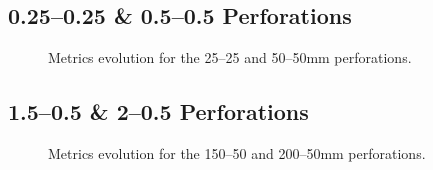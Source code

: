 \FloatBarrier
\pagebreak
\subsection{0.25--0.25 \& 0.5--0.5 Perforations}
\begin{figure}[!h]
    \centering
    
    \vspace*{-2em}
    \caption{Metrics evolution for the 25--25 and 50--50\si{\mm} perforations.}
    \label{fig:25--25-50--50-metrics-full}
\end{figure}

\begin{table}[!h]
    \caption{Numerical values of the metrics for the 25--25 and 50--50\si{\mm} perforations.}
    \label{tab:25--25-50--50}
    \begin{subtable}[t]{\linewidth}
        \centering
        \caption{0.25--0.25\si{\mm} Baseline controller}
        \label{tab:25--25-baseline}
        
    \end{subtable}
    \begin{subtable}[t]{\linewidth}
        \centering
        \vspace*{1em}
        \caption{0.25--0.25\si{\mm} Target adapter}
        \label{tab:25--25-adapter}
        
    \end{subtable}
    \begin{subtable}[t]{\linewidth}
        \centering
        \vspace*{1em}
        \caption{0.5--0.5\si{\mm} Baseline controller}
        \label{tab:50--50-baseline}
        
    \end{subtable}
    \begin{subtable}[t]{\linewidth}
        \centering
        \vspace*{1em}
        \caption{0.5--0.5\si{\mm} Target adapter}
        \label{tab:50--50-adapter}
        
    \end{subtable}
\end{table}


\FloatBarrier
\subsection{1.5--0.5 \& 2--0.5 Perforations}
\begin{figure}[!h]
    \centering
    
    \vspace*{-2em}
    \caption{Metrics evolution for the 150--50 and 200--50\si{\mm} perforations.}
    \label{fig:150--50-200--50-metrics-full}
\end{figure}

